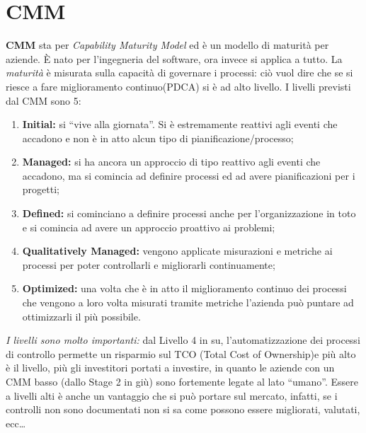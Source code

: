 \section{CMM}
\textbf{CMM} sta per \textit{Capability Maturity Model} ed è un modello di
maturità per aziende. È nato per l'ingegneria del software, ora invece si
applica a tutto. La \emph{maturità} è misurata sulla capacità di governare i
processi: ciò vuol dire che se si riesce a fare miglioramento continuo(PDCA) si
è ad alto livello. I livelli previsti dal CMM sono 5:
\begin{enumerate}
  \item \textbf{Initial:} si ``vive alla giornata''. Si è estremamente 
  reattivi agli eventi che accadono e non è in atto alcun tipo di 
  pianificazione/processo;
  \item \textbf{Managed:} si ha ancora un approccio di tipo reattivo agli 
  eventi che accadono, ma si comincia ad definire processi ed ad avere 
  pianificazioni per i progetti;
  \item \textbf{Defined:} si cominciano a definire processi anche per 
  l'organizzazione in toto e si comincia ad avere un approccio proattivo ai 
  problemi;
  \item \textbf{Qualitatively Managed:} vengono applicate misurazioni e
  metriche ai processi per poter controllarli e migliorarli continuamente;
  \item \textbf{Optimized:} una volta che è in atto il miglioramento continuo 
  dei processi che vengono a loro volta misurati tramite metriche l'azienda 
  può puntare ad ottimizzarli il più possibile.
\end{enumerate}
\emph{I livelli sono molto importanti:} dal Livello 4 in su,
l'automatizzazione dei processi di controllo permette un risparmio sul TCO
(Total Cost of Ownership)e più alto è il livello, più gli investitori portati a
investire, in quanto le aziende con un CMM basso (dallo Stage 2 in giù) sono
fortemente legate al lato ``umano''. Essere a livelli alti è anche un vantaggio
che si può portare sul mercato, infatti, se i controlli non sono documentati
non si sa come possono essere migliorati, valutati, ecc\dots



